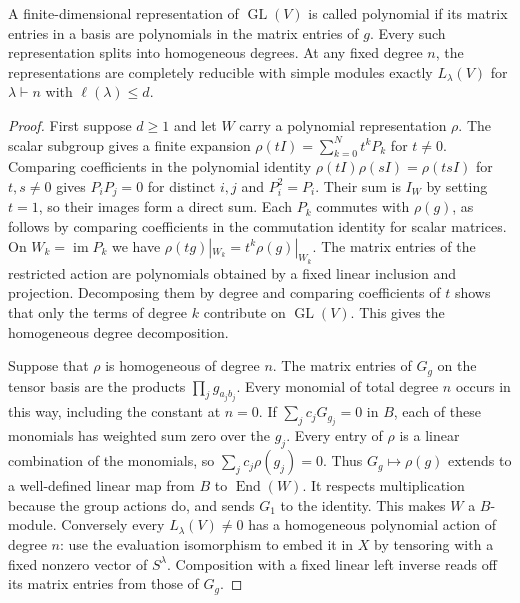 \begin{theorem}
\label{res:D11}
A finite-dimensional representation of \(\operatorname{GL}(V)\)
is called polynomial if its matrix entries in a basis are
polynomials in the matrix entries of \(g\). Every such
representation splits into homogeneous degrees. At any fixed
degree \(n\), the representations are completely reducible with
simple modules exactly \(L_\lambda(V)\) for \(\lambda\vdash n\)
with \(\ell(\lambda)\leq d\).
\end{theorem}

\begin{proof}
First suppose \(d\geq1\) and let \(W\) carry a polynomial
representation \(\rho\). The scalar subgroup gives a finite
expansion \(\rho(tI)=\sum_{k=0}^{N}t^k P_k\) for \(t\ne0\).
Comparing coefficients in the polynomial identity
\(\rho(tI)\rho(sI)=\rho(tsI)\) for \(t,s\ne0\) gives
\(P_iP_j=0\) for distinct \(i,j\) and \(P_i^2=P_i\).
Their sum is \(I_W\) by setting \(t=1\), so their images form a
direct sum. Each \(P_k\) commutes with \(\rho(g)\), as follows
by comparing coefficients in the commutation identity for
scalar matrices. On \(W_k=\operatorname{im}P_k\) we have
\(\rho(tg)|_{W_k}=t^k\rho(g)|_{W_k}\). The matrix entries of the
restricted action are polynomials obtained by a fixed linear
inclusion and projection. Decomposing them by degree and
comparing coefficients of \(t\) shows that only the terms of
degree \(k\) contribute on \(\operatorname{GL}(V)\). This gives
the homogeneous degree decomposition.

Suppose that \(\rho\) is homogeneous of degree \(n\).
The matrix entries of \(G_g\) on the tensor basis are the
products \(\prod_j g_{a_jb_j}\). Every monomial of total degree
\(n\) occurs in this way, including the constant at \(n=0\).
If \(\sum_j c_jG_{g_j}=0\) in \(B\), each of these monomials
has weighted sum zero over the \(g_j\). Every entry of \(\rho\)
is a linear combination of the monomials, so
\(\sum_j c_j\rho(g_j)=0\). Thus \(G_g\mapsto\rho(g)\) extends
to a well-defined linear map from \(B\) to
\(\operatorname{End}(W)\). It respects multiplication because
the group actions do, and sends \(G_1\) to the identity.
This makes \(W\) a \(B\)-module. Conversely every
\(L_\lambda(V)\ne0\) has a homogeneous polynomial action of
degree \(n\): use the evaluation isomorphism to embed it in
\(X\) by tensoring with a fixed nonzero vector of \(S^\lambda\).
Composition with a fixed linear left inverse reads off
its matrix entries from those of \(G_g\).


\end{proof}
